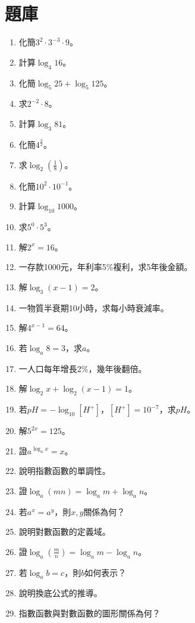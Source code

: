 \section{題庫}
\begin{enumerate}[label=\arabic*.]
    \item 化簡$3^2 \cdot 3^{-3} \cdot 9$。
    \item 計算$\log_4 16$。
    \item 化簡$\log_5 25 + \log_5 125$。
    \item 求$2^{-2} \cdot 8$。
    \item 計算$\log_3 81$。
    \item 化簡$4^{\frac{3}{2}}$。
    \item 求$\log_2 \left(\frac{1}{8}\right)$。
    \item 化簡$10^2 \cdot 10^{-1}$。
    \item 計算$\log_{10} 1000$。
    \item 求$5^0 \cdot 5^3$。
    \item 解$2^x = 16$。
    \item 一存款1000元，年利率5\%複利，求5年後金額。
    \item 解$\log_3 (x - 1) = 2$。
    \item 一物質半衰期10小時，求每小時衰減率。
    \item 解$4^{x-1} = 64$。
    \item 若$\log_a 8 = 3$，求$a$。
    \item 一人口每年增長2\%，幾年後翻倍。
    \item 解$\log_2 x + \log_2 (x - 1) = 1$。
    \item 若$pH = -\log_{10} [H^+]$，$[H^+] = 10^{-7}$，求$pH$。
    \item 解$5^{2x} = 125$。
    \item 證$a^{\log_a x} = x$。
    \item 說明指數函數的單調性。
    \item 證$\log_a (mn) = \log_a m + \log_a n$。
    \item 若$a^x = a^y$，則$x, y$關係為何？
    \item 說明對數函數的定義域。
    \item 證$\log_a \left(\frac{m}{n}\right) = \log_a m - \log_a n$。
    \item 若$\log_a b = c$，則$b$如何表示？
    \item 說明換底公式的推導。
    \item 指數函數與對數函數的圖形關係為何？

\end{enumerate}
